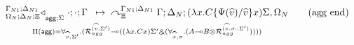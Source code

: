 
\[
\underset{
   \Pi(\m{agg}) = \forall_{\widehat{v}, \Sigma'}.
   (\defstwo{agg}{\widehat{v}}{\Sigma'} \lolli ((\lambda x. C x)\Sigma' \with (\forall_{\widehat{x}, \sigma}.
                                                (A \lolli B \otimes
                                                 \defstwo{agg}{\widehat{v}}{\sigma
                                                 ::\Sigma'}))))
}
{
\trans{
   \contstatea{\Delta_N}{\cdot ; \cdot}{\Gamma}{\Sigma}
}
{
   \derstatex{\Gamma}{\Delta_N}{\Xi}{\Gamma_{N1}}{\Delta_{N1}}{(\lambda x.
         C\{\Psi(\widehat{v})/\widehat{v}\} x) \Sigma,
      \Omega_N}
}
} \tag{agg end}
\]

